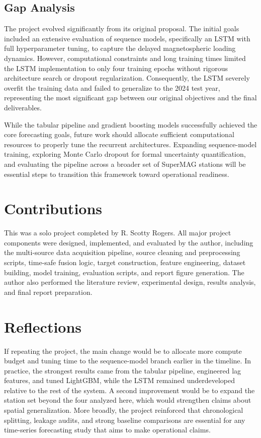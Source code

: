 \documentclass[conference]{IEEEtran}
\begin{document}
\subsection*{Gap Analysis}
The project evolved significantly from its original proposal. The initial goals included an extensive evaluation of sequence models, specifically an LSTM with full hyperparameter tuning, to capture the delayed magnetospheric loading dynamics. However, computational constraints and long training times limited the LSTM implementation to only four training epochs without rigorous architecture search or dropout regularization. Consequently, the LSTM severely overfit the training data and failed to generalize to the 2024 test year, representing the most significant gap between our original objectives and the final deliverables.

While the tabular pipeline and gradient boosting models successfully achieved the core forecasting goals, future work should allocate sufficient computational resources to properly tune the recurrent architectures. Expanding sequence-model training, exploring Monte Carlo dropout for formal uncertainty quantification, and evaluating the pipeline across a broader set of SuperMAG stations will be essential steps to transition this framework toward operational readiness.

\section*{Contributions}
This was a solo project completed by R. Scotty Rogers. All major project components were designed, implemented, and evaluated by the author, including the multi-source data acquisition pipeline, source cleaning and preprocessing scripts, time-safe fusion logic, target construction, feature engineering, dataset building, model training, evaluation scripts, and report figure generation. The author also performed the literature review, experimental design, results analysis, and final report preparation.

\section*{Reflections}
If repeating the project, the main change would be to allocate more compute budget and tuning time to the sequence-model branch earlier in the timeline. In practice, the strongest results came from the tabular pipeline, engineered lag features, and tuned LightGBM, while the LSTM remained underdeveloped relative to the rest of the system. A second improvement would be to expand the station set beyond the four analyzed here, which would strengthen claims about spatial generalization. More broadly, the project reinforced that chronological splitting, leakage audits, and strong baseline comparisons are essential for any time-series forecasting study that aims to make operational claims.
\end{document}
